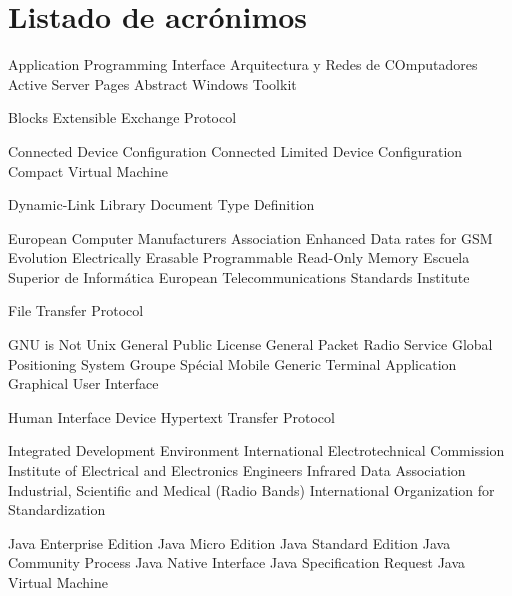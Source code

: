 
\chapter{Listado de acrónimos}

{\small
\begin{acronym}[XXXXXXXX]
       {Application Programming Interface}
      {Arquitectura y Redes de COmputadores}
       {Active Server Pages}
       {Abstract Windows Toolkit}

      {Blocks Extensible Exchange Protocol}
  
       {Connected Device Configuration}
      {Connected Limited Device Configuration}
       {Compact Virtual Machine}

       {Dynamic-Link Library}
       {Document Type Definition}

      {European Computer Manufacturers Association}
      {Enhanced Data rates for \acs{GSM} Evolution}
    {Electrically Erasable Programmable Read-Only Memory}
       {Escuela Superior de Informática}
      {European Telecommunications Standards Institute}

       {File Transfer Protocol}

       {GNU is Not Unix}
       {General Public License}
      {General Packet Radio Service}
       {Global Positioning System}
       {Groupe Spécial Mobile}
       {Generic Terminal Application}
       {Graphical User Interface}

       {Human Interface Device}
      {Hypertext Transfer Protocol}

       {Integrated Development Environment}
       {International Electrotechnical Commission}
      {Institute of Electrical and Electronics Engineers}
      {Infrared Data Association}
       {Industrial, Scientific and Medical (Radio Bands)}
       {International Organization for Standardization}

    {Java Enterprise Edition}
    {Java Micro Edition}
    {Java Standard Edition}
       {Java Community Process}
       {Java Native Interface}
       {Java Specification Request}
       {Java Virtual Machine}


\end{acronym}}
